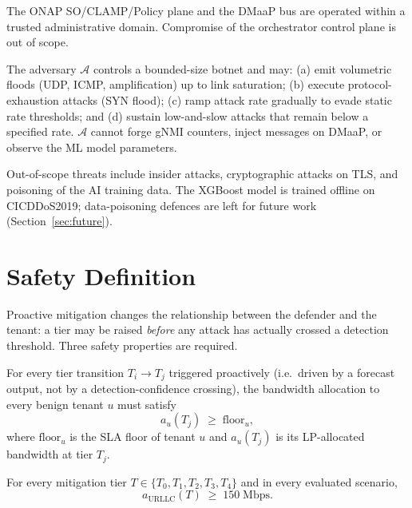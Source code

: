 \begin{assumption}
\label{asm:control}
The ONAP SO/CLAMP/Policy plane and the DMaaP bus are operated within a
trusted administrative domain. Compromise of the orchestrator control
plane is out of scope.
\end{assumption}

\begin{definition}
\label{def:adv}
The adversary $\mathcal{A}$ controls a bounded-size botnet and may:
(a) emit volumetric floods (UDP, ICMP, amplification) up to link
saturation; (b) execute protocol-exhaustion attacks (SYN flood);
(c) ramp attack rate gradually to evade static rate thresholds; and
(d) sustain low-and-slow attacks that remain below a specified rate.
$\mathcal{A}$ cannot forge gNMI counters, inject messages on DMaaP, or
observe the ML model parameters.
\end{definition}

Out-of-scope threats include insider attacks, cryptographic attacks on
TLS, and poisoning of the AI training data. The XGBoost model is trained
offline on CICDDoS2019; data-poisoning defences are left for future
work (Section~\ref{sec:future}).

\section{Safety Definition}
\label{sec:safety}

Proactive mitigation changes the relationship between the defender and
the tenant: a tier may be raised \emph{before} any attack has actually
crossed a detection threshold. Three safety properties are required.

\begin{definition}
\label{def:safety}
For every tier transition $T_i \to T_j$ triggered proactively (i.e.~driven
by a forecast output, not by a detection-confidence crossing), the
bandwidth allocation to every benign tenant $u$ must satisfy
\[
  a_u(T_j) \;\geq\; \text{floor}_u,
\]
where $\text{floor}_u$ is the SLA floor of tenant $u$ and $a_u(T_j)$
is its LP-allocated bandwidth at tier $T_j$.
\end{definition}

\begin{invariant}
\label{inv:urllc}
For every mitigation tier $T \in \{T_0, T_1, T_2, T_3, T_4\}$ and in
every evaluated scenario,
\[
  a_{\text{URLLC}}(T) \;\geq\; 150\;\text{Mbps}.
\]
\end{invariant}

